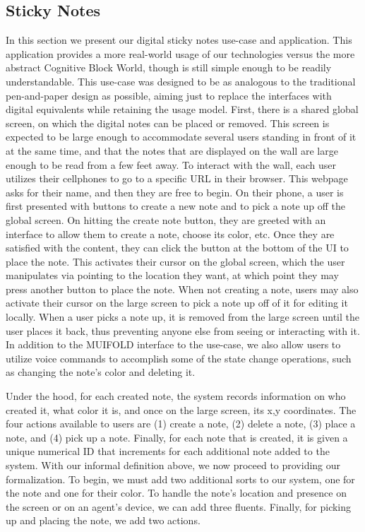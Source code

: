 \subsection{Sticky Notes}

In this section we present our digital sticky notes use-case and application. This
application provides a more real-world usage of our technologies versus the more
abstract Cognitive Block World, though is still simple enough to be readily
understandable. This use-case was designed to be as analogous to the traditional
pen-and-paper design as possible, aiming just to replace the interfaces with digital
equivalents while retaining the usage model. First, there is a shared global screen,
on which the digital notes can be placed or removed. This screen is expected to be
large enough to
accommodate several users standing in front of it at the same time, and that the notes
that are displayed on the wall are large enough to be read from a few feet away. To
interact with the wall, each user utilizes their cellphones to go to a specific URL in
their browser. This webpage asks for their name, and then they are free to begin. On
their phone, a user is first presented with buttons to create a new note and to pick
a note up off the global screen. On hitting the create note button, they are greeted
with an interface to allow them to create a note, choose its color, etc. Once they are
satisfied with the content, they can click the button at the bottom of the UI to place
the note. This activates their cursor on the global screen, which the user manipulates
via pointing to the location they want, at which point they may press another button
to place the note. When not creating a note, users may also activate their cursor on
the large screen to pick a note up off of it for editing it locally. When a user picks
a note up, it is removed from the large screen until the user places it back, thus
preventing anyone else from seeing or interacting with it. In addition to the MUIFOLD
interface to the use-case, we also allow users to utilize voice commands to accomplish
some of the state change operations, such as changing the note's color and deleting it.

Under the hood, for each created note, the system records information on who created it,
what color it is, and once on the large screen, its x,y coordinates. The four actions
available to users are (1) create a note, (2) delete a note, (3) place a note, and (4)
pick up a note. Finally, for each note that is created, it is given a unique numerical
ID that increments for each additional note added to the system. With our informal definition 
above, we now proceed to providing our formalization. To begin, we must add two additional
sorts to our system, one for the note and one for their color. To handle the note's location
and presence on the screen or on an agent's device, we can add three fluents. Finally,
for picking up and placing the note, we add two actions.

